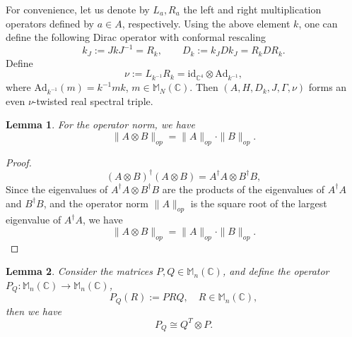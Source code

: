 \documentclass[a4paper,11pt]{article}
\newtheorem{lemma}{Lemma}
\begin{document}
For convenience, let us denote by $L_a, R_a$ the left and right multiplication
operators defined by $a \in A$, respectively. Using the above element $k$, one can define
the following Dirac operator with conformal rescaling
\begin{equation}
  k_J := JkJ^{- 1} = R_k, \qquad D_k := k_J Dk_J = R_k DR_k .
\end{equation}
Define
\begin{equation}
  \nu := L_{k^{- 1}} R_k = \mathrm{id}_{\mathbb{C}^4} \otimes
  \mathrm{Ad}_{k^{- 1}},
\end{equation}
where $\mathrm{Ad}_{k^{- 1}} (m) = k^{- 1} mk$, $m \in  \mathbb{M}_N (\mathbb{C})$. Then
$(A, H, D_k, J, \Gamma, \nu)$ forms an even $\nu$-twisted real spectral triple\cite{Brzezinski}.

\begin{lemma}\label{le7}
  For the operator norm, we have
  \begin{equation}
    \|A \otimes B\|_{op} = \|A\|_{op} \cdot \|B\|_{op} .
  \end{equation}
\end{lemma}

\begin{proof}
  \begin{equation}
    (A \otimes B)^{\dag}  (A \otimes B) = A^{\dag} A \otimes B^{\dag} B,
  \end{equation}
  Since the eigenvalues of $A^{\dag} A \otimes B^{\dag} B$ are the products of
  the eigenvalues of $A^{\dag} A$ and $B^{\dag} B$, and the operator norm
  $\|A\|_{op}$ is the square root of the largest eigenvalue of $A^{\dag} A$,
  we have
  \begin{equation}
    \|A \otimes B\|_{op} = \|A\|_{op} \cdot \|B\|_{op} .
  \end{equation}
\end{proof}

\begin{lemma}\label{le8}
  \cite{Magnus} Consider the matrices $P, Q \in \mathbb{M}_n (\mathbb{C})$, and define
  the operator $P_Q : \mathbb{M}_n (\mathbb{C}) \rightarrow \mathbb{M}_n
  (\mathbb{C})$,
  \begin{equation}
    P_Q (R) := PRQ, \quad R \in \mathbb{M}_n (\mathbb{C}),
  \end{equation}
  then we have
  \begin{equation}
    P_Q \cong Q^T \otimes P.
  \end{equation}
\end{lemma}
\end{document}
